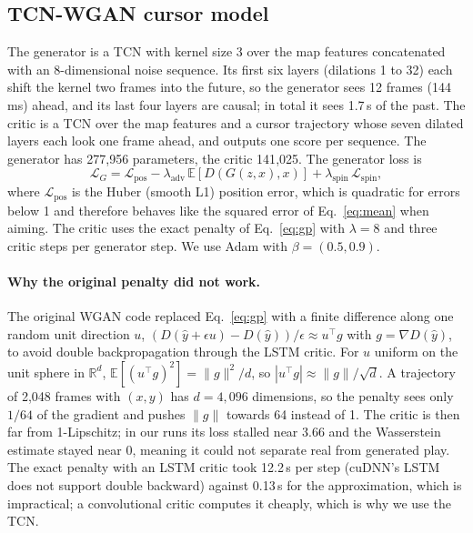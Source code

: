 \documentclass[11pt,a4paper]{article}
\newcommand{\E}{\mathbb{E}}
\begin{document}
\subsection{TCN-WGAN cursor model}
The generator is a TCN with kernel size 3 over the map features concatenated with an 8-dimensional noise
sequence. Its first six layers (dilations 1 to 32) each shift the kernel two frames into the future, so the
generator sees 12 frames (144\,ms) ahead, and its last four layers are causal; in total it sees 1.7\,s of the past. The critic is a TCN over the map features and a cursor trajectory whose seven dilated layers each look
one frame ahead, and outputs one score per sequence. The
generator has 277{,}956 parameters, the critic 141{,}025. The generator loss is
\begin{equation}
  \mathcal{L}_G = \mathcal{L}_{\mathrm{pos}} - \lambda_{\mathrm{adv}}\,\E[D(G(z,x),x)] + \lambda_{\mathrm{spin}}\,\mathcal{L}_{\mathrm{spin}},
\end{equation}
where $\mathcal{L}_{\mathrm{pos}}$ is the Huber (smooth L1) position error, which is quadratic for errors
below 1 and therefore behaves like the squared error of Eq.~\eqref{eq:mean} when aiming. The critic uses the
exact penalty of
Eq.~\eqref{eq:gp} with $\lambda=8$ and three critic steps per generator step. We use Adam
\citep{kingma2015} with $\beta=(0.5,0.9)$.

\paragraph{Why the original penalty did not work.} The original WGAN code replaced Eq.~\eqref{eq:gp} with a
finite difference along one random unit direction $u$, $(D(\hat y+\epsilon u)-D(\hat y))/\epsilon \approx
u^\top g$ with $g=\nabla D(\hat y)$, to avoid double backpropagation through the LSTM critic. For $u$ uniform
on the unit sphere in $\mathbb{R}^d$, $\E[(u^\top g)^2]=\lVert g\rVert^2/d$, so $|u^\top g|\approx\lVert
g\rVert/\sqrt d$. A trajectory of 2{,}048 frames with $(x,y)$ has $d=4{,}096$ dimensions, so the penalty sees
only $1/64$ of the gradient and pushes $\lVert g\rVert$ towards 64 instead of 1. The critic is then far from
1-Lipschitz; in our runs its loss stalled near 3.66 and the Wasserstein estimate stayed near 0, meaning it
could not separate real from generated play. The exact penalty with an LSTM critic took 12.2\,s per step
(cuDNN's LSTM does not support double backward) against 0.13\,s for the approximation, which is impractical;
a convolutional critic computes it cheaply, which is why we use the TCN.
\end{document}
